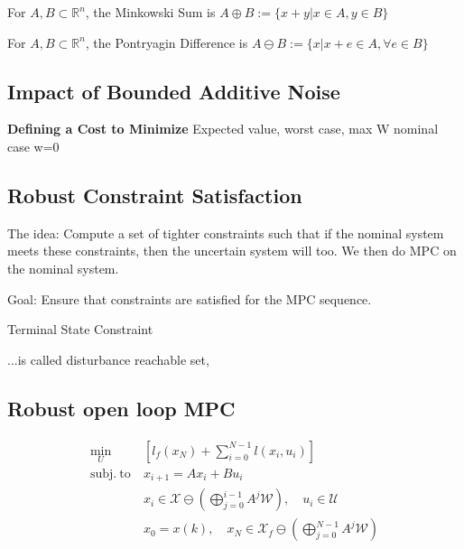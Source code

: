 
\begin{definition}
	For $A, B \subset \mathbb{R}^{n}$,
	the Minkowski Sum is
	$A \oplus B := \{x + y | x \in A, y \in B\}$
\end{definition}

\begin{definition}
	For $A, B \subset \mathbb{R}^{n}$,
	the Pontryagin Difference is
	$A \ominus B := \{x | x+e \in A, \forall e \in B\}$
\end{definition}

\subsection{Impact of Bounded Additive Noise}

\textbf{Defining a Cost to Minimize}
Expected value,
worst case, max W
nominal case w=0

\subsection{Robust Constraint Satisfaction}

The idea: Compute a set of tighter constraints such that if the nominal
system meets these constraints, then the uncertain system will too.
We then do MPC on the nominal system.

Goal: Ensure that constraints are satisfied for the MPC sequence.

Terminal State Constraint

...is called disturbance reachable set,

\subsection{Robust open loop MPC}
\begin{align*}
	\min_U                & \left[ l_f(x_N) + \textstyle\sum_{i=0}^{N-1} l(x_i, u_i) \right]                                    \\
	\mathrm{subj.\ to }\  & x_{i+1} = A x_i + B u_i                                                                             \\
	                      & x_i \in \mathcal{X} \ominus ( \textstyle\bigoplus_{j=0}^{i-1} A^j \mathcal{W} ), \quad
	u_i \in \mathcal{U}                                                                                                         \\
	                      & x_0 = x(k), \quad x_N \in \mathcal{X}_f \ominus ( \textstyle\bigoplus_{j=0}^{N-1} A^j \mathcal{W} )
\end{align*}

